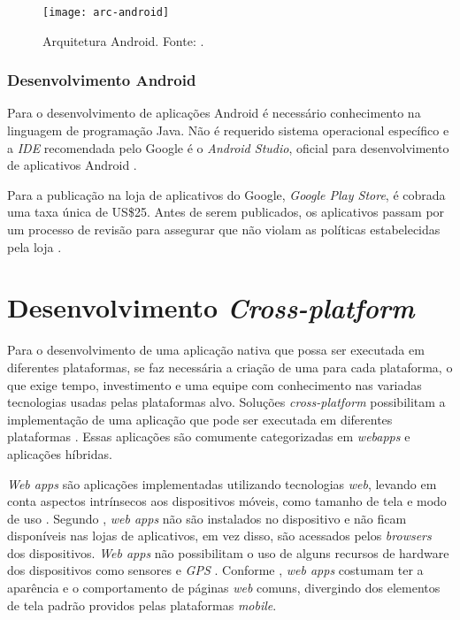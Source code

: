 \begin{figure}[h]
  \centering
    \texttt{[image: arc-android]}
    \caption[Arquitetura Android]{ Arquitetura Android. Fonte: \cite{android_android_2016}.}
	\label{fig:arc-android}
\end{figure}

\subsubsection{Desenvolvimento Android} \label{subsection:dev-android}

Para o desenvolvimento de aplicações Android é necessário conhecimento na linguagem de programação Java.
Não é requerido sistema operacional específico e a \textit{IDE} recomendada pelo Google é o \textit{Android Studio}, oficial para desenvolvimento de aplicativos Android \cite{android_meet_2016}.

Para a publicação na loja de aplicativos do Google, \textit{Google Play Store}, é cobrada uma taxa única de US\$25. 
Antes de serem publicados, os aplicativos passam por um processo de revisão para assegurar que não violam as políticas estabelecidas pela loja \cite{meier_creating_2015}.  

\section{Desenvolvimento \textit{Cross-platform}} \label{section:desenvolvimentomulti}

Para o desenvolvimento de uma aplicação nativa que possa ser executada em diferentes plataformas, se faz necessária a criação de uma para cada plataforma, o que exige tempo, investimento e uma equipe com conhecimento nas variadas tecnologias usadas pelas plataformas alvo.
Soluções \textit{cross-platform} possibilitam a implementação de uma aplicação que pode ser executada em diferentes plataformas \cite{kassas_taxonomy_2015}. Essas aplicações são comumente categorizadas em \textit{webapps} e aplicações híbridas.

\textit{Web apps} são aplicações implementadas utilizando tecnologias \textit{web}, levando em conta aspectos intrínsecos aos dispositivos móveis, como tamanho de tela e modo de uso \cite{heitkotter_evaluating_2013}. Segundo , \textit{web apps} não são instalados no dispositivo e não ficam disponíveis nas lojas de aplicativos, em vez disso, são acessados pelos \textit{browsers} dos dispositivos. \textit{Web apps} não possibilitam o uso de alguns recursos de hardware dos dispositivos como sensores e \textit{GPS} \cite{heitkotter_evaluating_2013}. Conforme , \textit{web apps} costumam ter a aparência e o comportamento de páginas \textit{web} comuns, divergindo dos elementos de tela padrão providos pelas plataformas \textit{mobile}.

